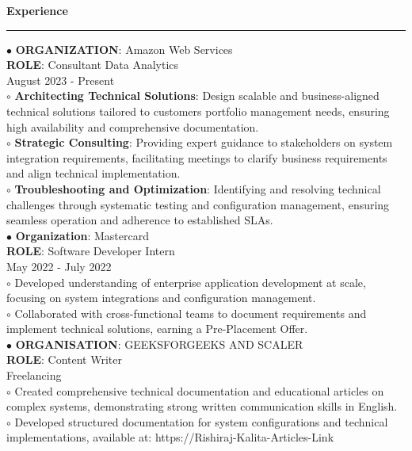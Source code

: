 \documentclass[11pt,a4paper]{article}
\renewcommand{\section}[1]{%
  \vspace{12pt}%
  {\large\bfseries #1}%
  \vspace{6pt}%
  \hrule%
  \vspace{6pt}%
}
\begin{document}
\section{Experience}

\noindent $\bullet$ \textbf{ORGANIZATION}: Amazon Web Services\\[0.2cm]
\textbf{ROLE}: Consultant Data Analytics\\[0.2cm]
August 2023 - Present\\[0.2cm]
\hspace{0.5cm}$\circ$ \textbf{Architecting Technical Solutions}: Design scalable and business-aligned technical solutions tailored to customers portfolio management needs, ensuring high availability and comprehensive documentation.\\[0.1cm]
\hspace{0.5cm}$\circ$ \textbf{Strategic Consulting}: Providing expert guidance to stakeholders on system integration requirements, facilitating meetings to clarify business requirements and align technical implementation.\\[0.1cm]
\hspace{0.5cm}$\circ$ \textbf{Troubleshooting and Optimization}: Identifying and resolving technical challenges through systematic testing and configuration management, ensuring seamless operation and adherence to established SLAs.\\[0.1cm]
\noindent $\bullet$ \textbf{Organization}: Mastercard\\[0.2cm]
\textbf{ROLE}: Software Developer Intern\\[0.2cm]
May 2022 - July 2022\\[0.2cm]
\hspace{0.5cm}$\circ$ Developed understanding of enterprise application development at scale, focusing on system integrations and configuration management.\\[0.1cm]
\hspace{0.5cm}$\circ$ Collaborated with cross-functional teams to document requirements and implement technical solutions, earning a Pre-Placement Offer.\\[0.1cm]
\noindent $\bullet$ \textbf{ORGANISATION}: GEEKSFORGEEKS AND SCALER\\[0.2cm]
\textbf{ROLE}: Content Writer\\[0.2cm]
Freelancing\\[0.2cm]
\hspace{0.5cm}$\circ$ Created comprehensive technical documentation and educational articles on complex systems, demonstrating strong written communication skills in English.\\[0.1cm]
\hspace{0.5cm}$\circ$ Developed structured documentation for system configurations and technical implementations, available at: https://Rishiraj-Kalita-Articles-Link\\[0.1cm]
\end{document}
